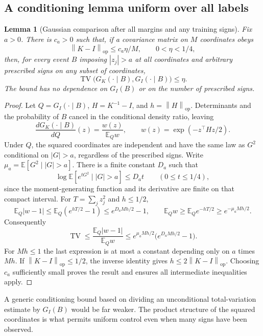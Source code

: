 \documentclass[11pt]{article}
\newtheorem{lemma}[theorem]{Lemma}
\theoremstyle{remark}\newtheorem{remark}[theorem]{Remark}
\newcommand{\E}{\mathbb E}
\newcommand{\TV}{\operatorname{TV}}
\newcommand{\norm}[1]{\left\lVert#1\right\rVert}
\newcommand{\abs}[1]{\left|#1\right|}
\begin{document}
\subsection{A conditioning lemma uniform over all labels}
\begin{lemma}[Gaussian comparison after all margins and any training signs]\label{lem:comparison}
Fix $a>0$. There is $c_a>0$ such that, if a covariance matrix on $M$ coordinates obeys
\begin{equation}\label{eq:opcondition}
 \norm{K-I}_{\mathrm{op}}\le c_a\eta/M,
 \qquad 0<\eta<1/4,
\end{equation}
then, for every event $B$ imposing $\abs{z_j}>a$ at all coordinates and arbitrary prescribed signs on any subset of coordinates,
\begin{equation}\label{eq:tv}
 \TV\bigl(G_K(\cdot\mid B),G_I(\cdot\mid B)\bigr)\le\eta.
\end{equation}
The bound has no dependence on $G_I(B)$ or on the number of prescribed signs.
\end{lemma}
\begin{proof}
Let $Q=G_I(\cdot\mid B)$, $H=K^{-1}-I$, and $h=\norm H_{\mathrm{op}}$. Determinants and the probability of $B$ cancel in the conditional density ratio, leaving
\[
 \frac{dG_K(\cdot\mid B)}{dQ}(z)=\frac{w(z)}{\E_Qw},
 \qquad w(z)=\exp(-z^\top Hz/2).
\]
Under $Q$, the squared coordinates are independent and have the same law as $G^2$ conditional on $\abs G>a$, regardless of the prescribed signs. Write $\mu_a=\E[G^2\mid\abs G>a]$. There is a finite constant $D_a$ such that
\[
 \log\E[e^{tG^2}\mid\abs G>a]\le D_at\qquad(0\le t\le1/4),
\]
since the moment-generating function and its derivative are finite on that compact interval. For $T=\sum_jz_j^2$ and $h\le1/2$,
\[
 \E_Q\abs{w-1}\le\E_Q(e^{hT/2}-1)
 \le e^{D_aMh/2}-1,
 \qquad
 \E_Qw\ge\E_Qe^{-hT/2}\ge e^{-\mu_aMh/2}.
\]
Consequently
\[
 \TV\le\frac{\E_Q\abs{w-1}}{\E_Qw}
 \le e^{\mu_aMh/2}\bigl(e^{D_aMh/2}-1\bigr).
\]
For $Mh\le1$ the last expression is at most a constant depending only on $a$ times $Mh$. If $\norm{K-I}_{\mathrm{op}}\le1/2$, the inverse identity gives $h\le2\norm{K-I}_{\mathrm{op}}$. Choosing $c_a$ sufficiently small proves the result and ensures all intermediate inequalities apply.
\end{proof}
A generic conditioning bound based on dividing an unconditional total-variation estimate by $G_I(B)$ would be far weaker. The product structure of the squared coordinates is what permits uniform control even when many signs have been observed.
\end{document}
